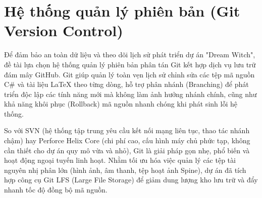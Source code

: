 \documentclass[../DoAn.tex]{subfiles}
\begin{document}
\section{Hệ thống quản lý phiên bản (Git Version Control)}
\label{section:tech:3.5}

Để đảm bảo an toàn dữ liệu và theo dõi lịch sử phát triển dự án "Dream Witch", đề tài lựa chọn hệ thống quản lý phiên bản phân tán Git kết hợp dịch vụ lưu trữ đám mây GitHub. Git giúp quản lý toàn vẹn lịch sử chỉnh sửa các tệp mã nguồn C\# và tài liệu LaTeX theo từng dòng, hỗ trợ phân nhánh (Branching) để phát triển độc lập các tính năng mới mà không làm ảnh hưởng nhánh chính, cũng như khả năng khôi phục (Rollback) mã nguồn nhanh chóng khi phát sinh lỗi hệ thống.

So với SVN (hệ thống tập trung yêu cầu kết nối mạng liên tục, thao tác nhánh chậm) hay Perforce Helix Core (chi phí cao, cấu hình máy chủ phức tạp, không cần thiết cho dự án quy mô vừa và nhỏ), Git là giải pháp gọn nhẹ, phổ biến và hoạt động ngoại tuyến linh hoạt. Nhằm tối ưu hóa việc quản lý các tệp tài nguyên nhị phân lớn (hình ảnh, âm thanh, tệp hoạt ảnh Spine), dự án đã tích hợp công cụ Git LFS (Large File Storage) để giảm dung lượng kho lưu trữ và đẩy nhanh tốc độ đồng bộ mã nguồn.

\end{document}
